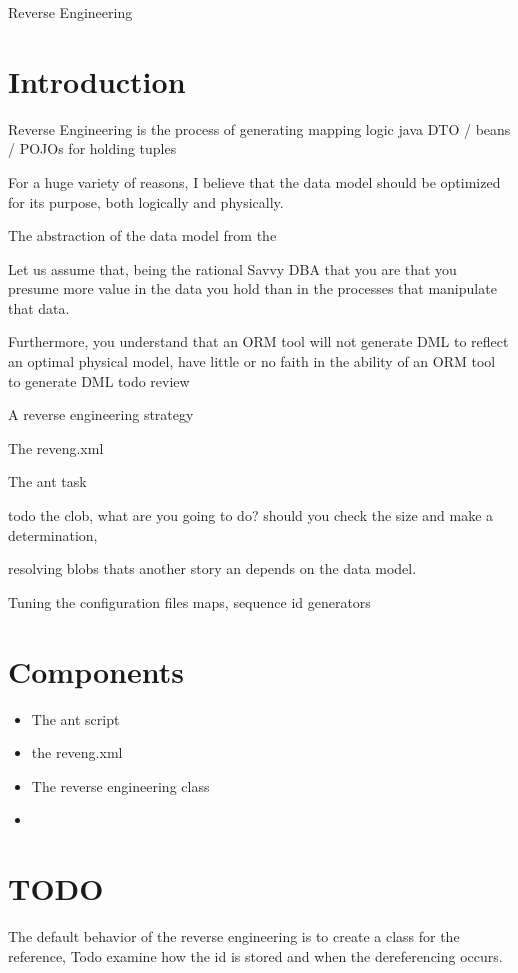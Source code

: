 Reverse Engineering

\section{Introduction}
Reverse Engineering is the process of generating 
   mapping logic
   java DTO / beans / POJOs for holding tuples 

For a huge variety of reasons, I believe that the data model should be optimized for its purpose, both logically and physically.

The abstraction of the data model from the 

Let us assume that, being the rational Savvy DBA that you are that you presume more value in the data you hold than in the processes that manipulate 
that data.

Furthermore, you understand that an ORM tool will not generate DML to reflect an optimal physical model,
 have little or no faith in the ability of an ORM tool to generate DML 
todo review

A reverse engineering strategy

The reveng.xml

The ant task


todo the clob, what are you going to do?  should you check the size and make a determination,

resolving blobs thats another story an depends on the data model.


Tuning the configuration files maps, sequence id generators 

\section{Components}
\begin{itemize}
 \item The ant script 
 \item the reveng.xml
 \item The reverse engineering class
 \item 
\end{itemize}


\section{TODO}

The default behavior of the reverse engineering is to create a class for the reference,
Todo examine how the id is stored and when the dereferencing occurs.

